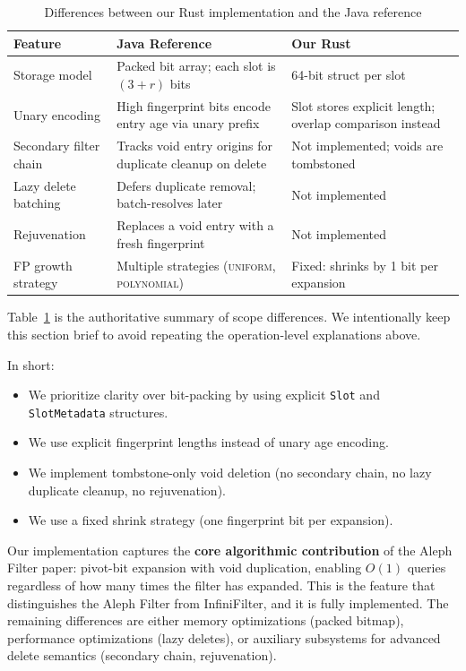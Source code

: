 \begin{table}[H]
  \centering
  \caption{Differences between our Rust implementation and the Java reference}
  \label{tab:differences}
  \begin{tabular}{p{3.2cm} p{4.2cm} p{4.8cm}}
    \hline
    \textbf{Feature} & \textbf{Java Reference} & \textbf{Our Rust} \\
    \hline
    Storage model & Packed bit array; each slot is $(3{+}r)$ bits & 64-bit struct per slot \\
    \hline
    Unary encoding & High fingerprint bits encode entry age via unary prefix & Slot stores explicit length; overlap comparison instead \\
    \hline
    Secondary filter chain & Tracks void entry origins for duplicate cleanup on delete & Not implemented; voids are tombstoned \\
    \hline
    Lazy delete batching & Defers duplicate removal; batch-resolves later & Not implemented \\
    \hline
    Rejuvenation & Replaces a void entry with a fresh fingerprint & Not implemented \\
    \hline
    FP growth strategy & Multiple strategies (\textsc{uniform}, \textsc{polynomial}) & Fixed: shrinks by 1 bit per expansion \\
    \hline
  \end{tabular}
\end{table}

Table~\ref{tab:differences} is the authoritative summary of scope differences. We intentionally keep this section brief to avoid repeating the operation-level explanations above.

In short:
\begin{itemize}
  \item We prioritize clarity over bit-packing by using explicit \texttt{Slot} and \texttt{SlotMetadata} structures.
  \item We use explicit fingerprint lengths instead of unary age encoding.
  \item We implement tombstone-only void deletion (no secondary chain, no lazy duplicate cleanup, no rejuvenation).
  \item We use a fixed shrink strategy (one fingerprint bit per expansion).
\end{itemize}

\begin{insightbox}
Our implementation captures the \textbf{core algorithmic contribution} of the Aleph Filter paper: pivot-bit expansion with void duplication, enabling $O(1)$ queries regardless of how many times the filter has expanded. This is the feature that distinguishes the Aleph Filter from InfiniFilter, and it is fully implemented. The remaining differences are either memory optimizations (packed bitmap), performance optimizations (lazy deletes), or auxiliary subsystems for advanced delete semantics (secondary chain, rejuvenation).
\end{insightbox}

